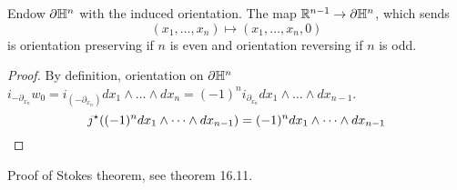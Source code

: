 \begin{lemma}\label{lem:11.10}
    Endow \(\partial \mathbb{H}^n\) with the induced orientation. The map \(\mathbb{R}^{n-1}\to\partial \mathbb{H}^n\),
    which sends \[(x_1,\dots,x_n)\mapsto (x_1,\dots,x_n,0)\]
    is orientation preserving if \(n\) is even and orientation reversing if \(n\) is odd.
\end{lemma}

\begin{proof}
    By definition, orientation on \(\partial \mathbb{H}^n\) \(i_{-\partial_{x_n}}w_0=i_{(-\partial_{x_n})}dx_1\wedge\dots\wedge dx_n = (-1)^{n}i_{\partial_{x_n}}dx_1\wedge \dots \wedge dx_{n-1}\).
    \[j^\star((-1)^ndx_1\wedge \dots \wedge dx_{n-1})=(-1)^n dx_1\wedge\dots \wedge dx_{n-1}\qedhere\]
\end{proof}
Proof of Stokes theorem, see \cite{smooth_manifolds} theorem 16.11.


